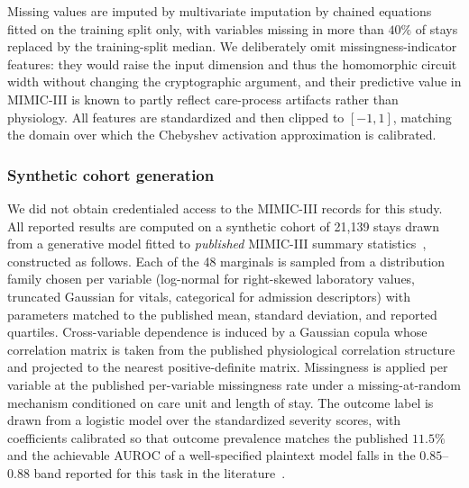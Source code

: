 \documentclass[journal,compsoc]{IEEEtran}
\begin{document}
Missing values are imputed by multivariate imputation by chained
equations~\cite{vanbuuren2011mice} fitted on the training split only, with
variables missing in more than $40\%$ of stays replaced by the training-split
median. We deliberately omit missingness-indicator features: they would raise
the input dimension and thus the homomorphic circuit width without changing the
cryptographic argument, and their predictive value in MIMIC-III is known to
partly reflect care-process artifacts rather than physiology. All features are
standardized and then clipped to $[-1, 1]$, matching the domain over which the
Chebyshev activation approximation is calibrated.

\subsubsection{Synthetic cohort generation}

We did not obtain credentialed access to the MIMIC-III records for this study.
All reported results are computed on a synthetic cohort of 21{,}139 stays drawn
from a generative model fitted to \emph{published} MIMIC-III summary
statistics~\cite{johnson2016mimic,harutyunyan2019multitask}, constructed as
follows. Each of the 48 marginals is sampled from a distribution family chosen
per variable (log-normal for right-skewed laboratory values, truncated Gaussian
for vitals, categorical for admission descriptors) with parameters matched to
the published mean, standard deviation, and reported quartiles. Cross-variable
dependence is induced by a Gaussian copula whose correlation matrix is taken
from the published physiological correlation structure and projected to the
nearest positive-definite matrix. Missingness is applied per variable at the
published per-variable missingness rate under a missing-at-random mechanism
conditioned on care unit and length of stay. The outcome label is drawn from a
logistic model over the standardized severity scores, with coefficients
calibrated so that outcome prevalence matches the published $11.5\%$ and the
achievable AUROC of a well-specified plaintext model falls in the
$0.85$--$0.88$ band reported for this task in the
literature~\cite{harutyunyan2019multitask}.
\end{document}
